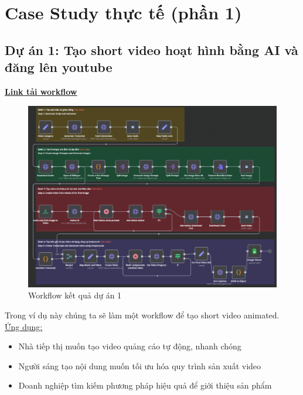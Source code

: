 \chapter{Case Study thực tế (phần 1)}

\section{\textbf{Dự án 1: Tạo short video hoạt hình bằng AI và đăng lên youtube }}

\href{https://drive.google.com/file/d/1hBEgM7DZBiMOocM_pxGyne7T97oAKK_B/view?usp=sharing}{\textbf{\underline {Link tải workflow}}}

\begin{figure}[h]
    \centering
    \includegraphics[width=1\textwidth]{images/Da1-01.png}
    \caption{Workflow kết quả dự án 1}
    
\end{figure}

Trong ví dụ này chúng ta sẽ làm một workflow để tạo short video animated. \\

\underline{Ứng dụng:}\\
\begin{itemize}[label=-]
    \item Nhà tiếp thị muốn tạo video quảng cáo tự động, nhanh chóng
    \item Người sáng tạo nội dung muốn tối ưu hóa quy trình sản xuất video
    \item Doanh nghiệp tìm kiếm phương pháp hiệu quả để giới thiệu sản phẩm 
\end{itemize}


